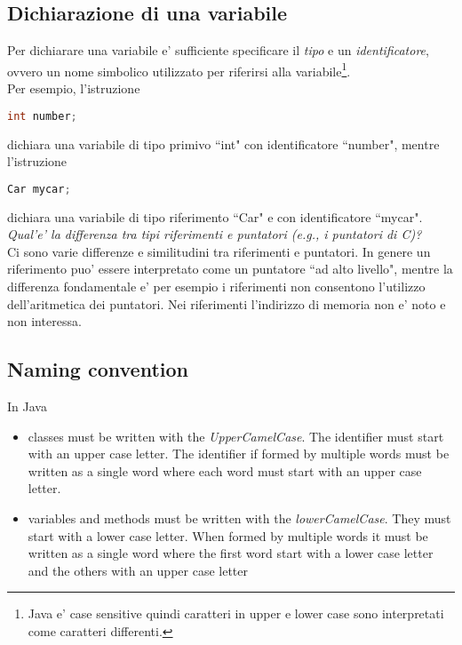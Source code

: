 \documentclass{article}
\begin{document}
\subsection{Dichiarazione di una variabile}
Per dichiarare una variabile e' sufficiente specificare il \emph{tipo} e un \emph{identificatore}, ovvero un nome simbolico utilizzato per riferirsi alla variabile\footnote{Java e' case sensitive quindi caratteri in upper e lower case sono interpretati come caratteri differenti.}. \\
Per esempio, l'istruzione
\begin{lstlisting}[language=Java,escapechar=|]
int number;
\end{lstlisting}
dichiara una variabile di tipo primivo ``int" con identificatore ``number", mentre l'istruzione
\begin{lstlisting}[language=Java,escapechar=|]
Car mycar;
\end{lstlisting}
dichiara una variabile di tipo riferimento ``Car" e con identificatore ``mycar".\\

\emph{Qual'e' la differenza tra tipi riferimenti e puntatori (e.g., i puntatori di C)?}\\
Ci sono varie differenze e similitudini tra riferimenti e puntatori. In genere un riferimento puo' essere interpretato come un puntatore ``ad alto livello", mentre la differenza fondamentale e' per esempio i riferimenti non consentono l'utilizzo dell'aritmetica dei puntatori. Nei riferimenti l'indirizzo di memoria non e' noto e non interessa.

\subsection{Naming convention}
In Java 
\begin{itemize}
\item classes must be written with the \emph{UpperCamelCase}. The identifier must start with an upper case letter. The identifier if formed by multiple words must be written as a single word where each word must start with an upper case letter.
\item variables and methods must be written with the \emph{lowerCamelCase}. They must start with a lower case letter. When formed by multiple words it must be written as a single word where the first word start with a lower case letter and the others with an upper case letter
\end{itemize}
\end{document}
